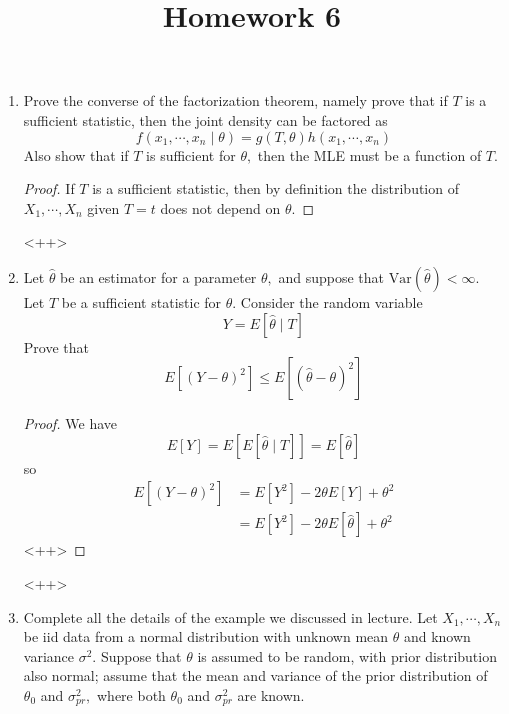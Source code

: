 \documentclass{article}
\newcommand{\var}{\mathrm{Var}}
\begin{document}
\title{Homework 6}
\maketitle
\thispagestyle{fancy}

\begin{enumerate}
	\item Prove the converse of the factorization theorem, namely prove that if $T$ is a sufficient statistic, then the joint density can be factored as \[f(x_1, \cdots, x_n\mid\theta)=g(T, \theta)h(x_1, \cdots, x_n)\] Also show that if $T$ is sufficient for $\theta,$ then the MLE must be a function of $T.$
		\begin{proof}
			If $T$ is a sufficient statistic, then by definition the distribution of $X_1, \cdots, X_n$ given $T=t$ does not depend on $\theta.$
		\end{proof}<++>

	\item Let $\hat{\theta}$ be an estimator for a parameter $\theta,$ and suppose that $\var(\hat{\theta})<\infty.$ Let $T$ be a sufficient statistic for $\theta.$ Consider the random variable \[Y=E[\hat{\theta}\mid T]\] Prove that \[E\left[ \left( Y-\theta \right)^2 \right]\le E\left[ \left( \hat{\theta}-\theta \right)^2 \right]\]
		\begin{proof}
			We have \[E[Y]=E\left[ E[\hat{\theta}\mid T] \right] = E[\hat{\theta}]\] so
			\begin{align*}
				E\left[ (Y-\theta)^2 \right] &= E[Y^2]-2\theta E[Y] + \theta^2 \\
				&= E[Y^2] - 2\theta E[\hat{\theta}]+\theta^2
			\end{align*}<++>
		\end{proof}<++>

	\item Complete all the details of the example we discussed in lecture. Let $X_1, \cdots, X_n$ be iid data from a normal distribution with unknown mean $\theta$ and known variance $\sigma^2.$ Suppose that $\theta$ is assumed to be random, with prior distribution also normal; assume that the mean and variance of the prior distribution of $\theta_0$ and $\sigma_{pr}^2,$ where both $\theta_0$ and $\sigma_{pr}^2$ are known.


\end{enumerate}
\end{document}
